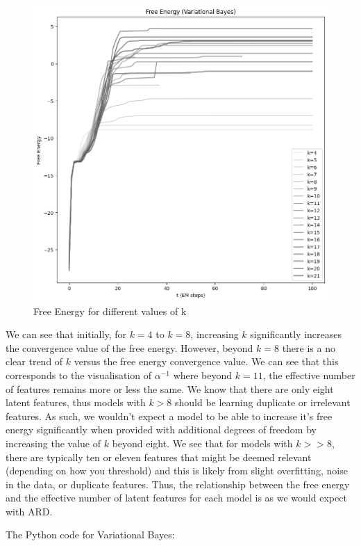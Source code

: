 \documentclass[12pt]{article}
\begin{document}
\begin{figure}[h]
\centering
\includegraphics[scale=0.4]{outputs/q4/b-free-energy}
\caption{Free Energy for different values of k}
\label{fig:}
\end{figure}

We can see that initially, for $k=4$ to $k=8$, increasing $k$ significantly increases the convergence value of the free energy. However, beyond $k=8$ there is a no clear trend of $k$ versus the free energy convergence value. We can see that this corresponds to the visualisation of $\alpha^{-1}$ where beyond $k=11$, the effective number of features remains more or less the same. We know that there are only eight latent features, thus models with $k>8$ should be learning duplicate or irrelevant features. As such, we wouldn't expect a model to be able to increase it's free energy significantly when provided with additional degrees of freedom by increasing the value of $k$ beyond eight. We see that for models with $k>>8$, there are typically ten or eleven features that might be deemed relevant (depending on how you threshold) and this is likely from slight overfitting, noise in the data, or duplicate features. Thus, the relationship between the free energy and the effective number of latent features for each model is as we would expect with ARD.


\newpage
The Python code for Variational Bayes:

\end{document}
